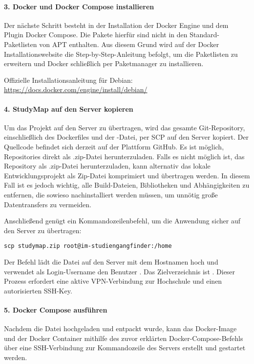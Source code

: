 \paragraph*{3. Docker und Docker Compose installieren}
Der nächste Schritt besteht in der Installation der Docker Engine und dem Plugin Docker Compose. Die Pakete hierfür sind nicht in den Standard-Paketlisten von APT enthalten. Aus diesem Grund wird auf der Docker Installationswebsite die Step-by-Step-Anleitung befolgt, um die Paketlisten zu erweitern und Docker schließlich per Paketmanager zu installieren.

\noindent
Offizielle Installationsanleitung für Debian: \url{https://docs.docker.com/engine/install/debian/}

\paragraph*{4. StudyMap auf den Server kopieren}
Um das Projekt auf den Server zu übertragen, wird das gesamte Git-Repository, einschließlich des Dockerfiles und der -Datei, per SCP auf den Server kopiert. Der Quellcode befindet sich derzeit auf der Plattform GitHub. Es ist möglich, Repositories direkt als .zip-Datei herunterzuladen. Falls es nicht möglich ist, das Repository als .zip-Datei herunterzuladen, kann alternativ das lokale Entwicklungsprojekt als Zip-Datei komprimiert und übertragen werden. In diesem Fall ist es jedoch wichtig, alle Build-Dateien, Bibliotheken und Abhängigkeiten zu entfernen, die sowieso nachinstalliert werden müssen, um unnötig große Datentransfers zu vermeiden.

Anschließend genügt ein Kommandozeilenbefehl, um die Anwendung sicher auf den Server zu übertragen:
\begin{lstlisting}[style=Python]
scp studymap.zip root@im-studiengangfinder:/home
\end{lstlisting}

Der Befehl lädt die Datei  auf den Server mit dem Hostnamen  hoch und verwendet als Login-Username den Benutzer . Das Zielverzeichnis ist . Dieser Prozess erfordert eine aktive VPN-Verbindung zur Hochschule und einen autorisierten SSH-Key. %

\paragraph*{5. Docker Compose ausführen}
Nachdem die Datei hochgeladen und entpackt wurde, kann das Docker-Image und der Docker Container mithilfe des zuvor erklärten Docker-Compose-Befehls über eine SSH-Verbindung zur Kommandozeile des Servers erstellt und gestartet werden.

